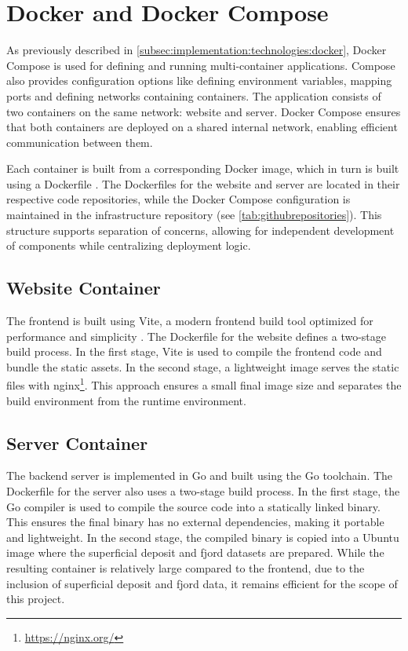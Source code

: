 \section{Docker and Docker Compose}

As previously described in \autoref{subsec:implementation:technologies:docker}, Docker Compose is used for defining and running multi-container applications. Compose also provides configuration options like defining environment variables, mapping ports and defining networks containing containers. The application consists of two containers on the same network: website and server. Docker Compose ensures that both containers are deployed on a shared internal network, enabling efficient communication between them.

Each container is built from a corresponding Docker image, which in turn is built using a Dockerfile \cite{dockerwikipedia}. The Dockerfiles for the website and server are located in their respective code repositories, while the Docker Compose configuration is maintained in the infrastructure repository (see \autoref{tab:githubrepositories}). This structure supports separation of concerns, allowing for independent development of components while centralizing deployment logic.

\subsection{Website Container}

The frontend is built using Vite, a modern frontend build tool optimized for performance and simplicity \cite{vite}. The Dockerfile for the website defines a two-stage build process. In the first stage, Vite is used to compile the frontend code and bundle the static assets. In the second stage, a lightweight image serves the static files with nginx\footnote{\url{https://nginx.org/}}. This approach ensures a small final image size and separates the build environment from the runtime environment. 

\subsection{Server Container}

The backend server is implemented in Go and built using the Go toolchain. The Dockerfile for the server also uses a two-stage build process. In the first stage, the Go compiler is used to compile the source code into a statically linked binary. This ensures the final binary has no external dependencies, making it portable and lightweight. In the second stage, the compiled binary is copied into a Ubuntu image where the superficial deposit and fjord datasets are prepared. While the resulting container is relatively large compared to the frontend, due to the inclusion of superficial deposit and fjord data, it remains efficient for the scope of this project.

